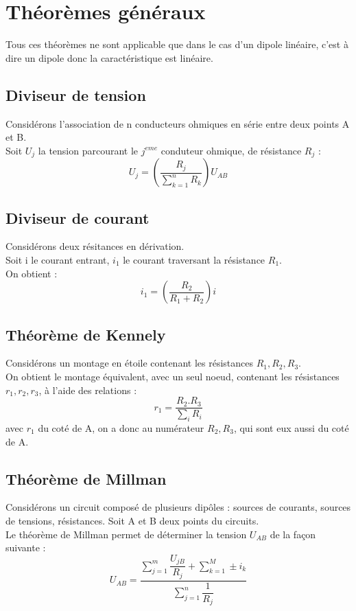 \chapter{Théorèmes généraux}
Tous ces théorèmes ne sont applicable que dans le cas d'un dipole linéaire, c'est à dire un dipole donc la caractéristique est linéaire.
\section{Diviseur de tension}
Considérons l'association de n conducteurs ohmiques en série entre deux points A et B.\\
Soit $U_j$ la tension parcourant le $j^{eme}$ conduteur ohmique, de résistance $R_j$ :
$$U_j = \left( \dfrac{R_j}{\sum_{k=1}^n R_k}\right)U_{AB} $$
\section{Diviseur de courant}
Considérons deux résitances en dérivation.\\
Soit i le courant entrant, $i_1$ le courant traversant la résistance $R_1$.\\
On obtient :
$$i_1 = \left( \dfrac{R_2}{R_1+R_2}\right)i$$
\section{Théorème de Kennely}
Considérons un montage en étoile contenant les résistances $R_1,R_2,R_3$.\\
On obtient le montage équivalent, avec un seul noeud, contenant les résistances $r_1,r_2,r_3$, à l'aide des relations :
$$r_1 = \dfrac{R_2.R_3}{\sum_i R_i}$$
avec $r_1$ du coté de A, on a donc au numérateur $R_2,R_3$, qui sont eux aussi du coté de A.
\section{Théorème de Millman}
Considérons un circuit composé de plusieurs dipôles : sources de courants, sources de tensions, résistances.
Soit A et B deux points du circuits.\\
Le théorème de Millman permet de déterminer la tension $U_{AB}$ de la façon suivante :
$$U_{AB} = \dfrac{\sum_{j=1}^m \dfrac{U_{jB}}{R_j} + \sum_{k=1}^M \pm i_k}{\sum_{j=1}^n \dfrac{1}{R_j}}$$
